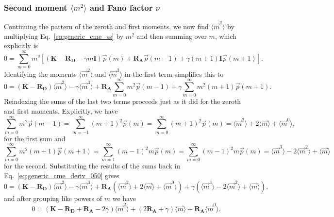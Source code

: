 \subsubsection{Second moment $\langle{m}^2\rangle$ and Fano factor $\nu$}
Continuing the pattern of the zeroth and first moments, we now find
$\langle\vec{m}^2\rangle$ by multiplying Eq.~\ref{eq:generic_cme_ss} by $m^2$
and then summing over $m$, which explicitly is
\begin{equation}
0 = \sum_{m=0}^\infty m^2 \left[
\left( \mathbf{K} - \mathbf{R_D} - \gamma m \mathbf{I} \right) \vec{p}(m)
            + \mathbf{R_A} \vec{p}(m-1) +
            \gamma (m+1) \mathbf{I} \vec{p}(m+1)
\right].
\end{equation}
Identifying the moments $\langle\vec{m}^2\rangle$ and $\langle\vec{m}^3\rangle$
in the first term simplifies this to
\begin{equation}
0 = (\mathbf{K} - \mathbf{R_D}) \langle\vec{m}^2\rangle
    - \gamma \langle\vec{m}^3\rangle + \mathbf{R_A} \sum_{m=0}^\infty m^2\vec{p}(m-1)
    + \gamma \sum_{m=0}^\infty m^2(m+1)\vec{p}(m+1).
\label{eq:generic_cme_deriv_050}
\end{equation}
Reindexing the sums of the last two terms proceeds just as it did for the zeroth
and first moments. Explicitly, we have
\begin{equation}
\sum_{m=0}^\infty m^2\vec{p}(m-1)
= \sum_{m=-1}^\infty (m+1)^2\vec{p}(m)
= \sum_{m=0}^\infty (m+1)^2\vec{p}(m)
= \langle\vec{m}^2\rangle + 2\langle\vec{m}\rangle + \langle\vec{m}^0\rangle,
\end{equation}
for the first sum and
\begin{equation}
\sum_{m=0}^\infty m^2(m+1)\vec{p}(m+1)
= \sum_{m=1}^\infty (m-1)^2m\vec{p}(m)
= \sum_{m=0}^\infty (m-1)^2 m\vec{p}(m)
= \langle\vec{m}^3\rangle - 2\langle\vec{m}^2\rangle + \langle\vec{m}\rangle
\end{equation}
for the second. Substituting the results of the sums back in
Eq.~\ref{eq:generic_cme_deriv_050} gives
\begin{equation}
0 = (\mathbf{K} - \mathbf{R_D}) \langle\vec{m}^2\rangle
- \gamma \langle\vec{m}^3\rangle
+ \mathbf{R_A}
    (\langle\vec{m}^2\rangle + 2\langle\vec{m}\rangle + \langle\vec{m}^0\rangle)
+ \gamma
    (\langle\vec{m}^3\rangle - 2\langle\vec{m}^2\rangle + \langle\vec{m}\rangle),
\end{equation}
and after grouping like powers of $m$ we have
\begin{equation}
0 = (\mathbf{K} - \mathbf{R_D} + \mathbf{R_A} - 2\gamma) \langle\vec{m}^2\rangle
+ (2\mathbf{R_A} + \gamma) \langle\vec{m}\rangle
+ \mathbf{R_A} \langle\vec{m}^0\rangle.
\label{eq:generic_cme_deriv_060}
\end{equation}
